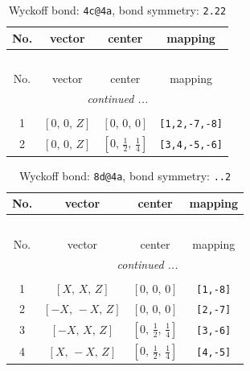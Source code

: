 \documentclass[fleqn,8pt]{jsarticle}
\begin{document}
\renewcommand{\arraystretch}{1.2}
\begin{longtable}{cccc}
\caption{Wyckoff bond: {\tt 4c@4a}, bond symmetry: {\tt 2.22}}
 \\
 \hline \hline
No. & vector & center & mapping \\ \hline \endfirsthead

\multicolumn{3}{l}{\tablename\ \thetable{}} \\
 \hline \hline
No. & vector & center & mapping \\ \hline \endhead

 \hline \hline
\multicolumn{3}{r}{\footnotesize\it continued ...} \\ \endfoot

 \hline \hline
\multicolumn{3}{r}{} \\ \endlastfoot

1 & $\left[ 0,\, 0,\, Z \right]$ & $\left[ 0,\, 0,\, 0 \right]$ & {\tt [1,2,-7,-8]} \\ \hline
2 & $\left[ 0,\, 0,\, Z \right]$ & $\left[ 0,\, \frac{1}{2},\, \frac{1}{4} \right]$ & {\tt [3,4,-5,-6]} \\
\end{longtable}
\renewcommand{\arraystretch}{1.2}
\begin{longtable}{cccc}
\caption{Wyckoff bond: {\tt 8d@4a}, bond symmetry: {\tt ..2}}
 \\
 \hline \hline
No. & vector & center & mapping \\ \hline \endfirsthead

\multicolumn{3}{l}{\tablename\ \thetable{}} \\
 \hline \hline
No. & vector & center & mapping \\ \hline \endhead

 \hline \hline
\multicolumn{3}{r}{\footnotesize\it continued ...} \\ \endfoot

 \hline \hline
\multicolumn{3}{r}{} \\ \endlastfoot

1 & $\left[ X,\, X,\, Z \right]$ & $\left[ 0,\, 0,\, 0 \right]$ & {\tt [1,-8]} \\ \hline
2 & $\left[ - X,\, - X,\, Z \right]$ & $\left[ 0,\, 0,\, 0 \right]$ & {\tt [2,-7]} \\ \hline
3 & $\left[ - X,\, X,\, Z \right]$ & $\left[ 0,\, \frac{1}{2},\, \frac{1}{4} \right]$ & {\tt [3,-6]} \\ \hline
4 & $\left[ X,\, - X,\, Z \right]$ & $\left[ 0,\, \frac{1}{2},\, \frac{1}{4} \right]$ & {\tt [4,-5]} \\
\end{longtable}
\end{document}
